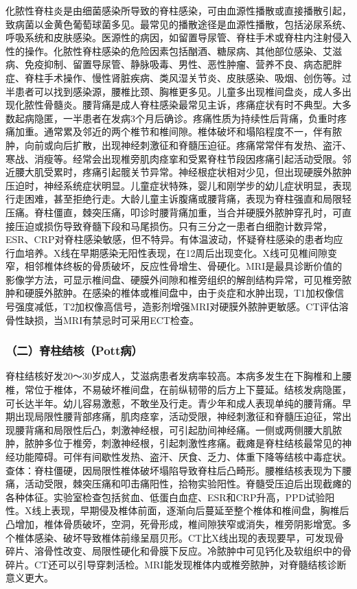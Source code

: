 化脓性脊柱炎是由细菌感染所导致的脊柱感染，可由血源性播散或直接播散引起，致病菌以金黄色葡萄球菌多见。最常见的播散途径是血源性播散，包括泌尿系统、呼吸系统和皮肤感染。医源性的病因，如留置导尿管、脊柱手术或脊柱内注射侵入性的操作。化脓性脊柱感染的危险因素包括酗酒、糖尿病、其他部位感染、艾滋病、免疫抑制、留置导尿管、静脉吸毒、男性、恶性肿瘤、营养不良、病态肥胖症、脊柱手术操作、慢性肾脏疾病、类风湿关节炎、皮肤感染、吸烟、创伤等。过半患者可以找到感染源，腰椎比颈、胸椎更多见。儿童多出现椎间盘炎，成人多出现化脓性骨髓炎。腰背痛是成人脊柱感染最常见主诉，疼痛症状有时不典型。大多数起病隐匿，一半患者在发病3个月后确诊。疼痛性质为持续性后背痛，负重时疼痛加重。通常累及邻近的两个椎节和椎间隙。椎体破坏和塌陷程度不一，伴有脓肿，向前或向后扩散，出现神经刺激征和脊髓压迫征。疼痛常常伴有发热、盗汗、寒战、消瘦等。经常会出现椎旁肌肉痉挛和受累脊柱节段因疼痛引起活动受限。邻近腰大肌受累时，疼痛引起髋关节异常。神经根症状相对少见，但出现硬膜外脓肿压迫时，神经系统症状明显。儿童症状特殊，婴儿和刚学步的幼儿症状明显，表现行走困难，甚至拒绝行走。大龄儿童主诉腹痛或腰背痛，表现为脊柱强直和局限轻压痛。脊柱僵直，棘突压痛，叩诊时腰背痛加重，当合并硬膜外脓肿穿孔时，可直接压迫或损伤导致脊髓下段和马尾损伤。只有三分之一患者白细胞计数异常，ESR、CRP对脊柱感染敏感，但不特异。有体温波动，怀疑脊柱感染的患者均应行血培养。X线在早期感染无阳性表现，在12周后出现变化。X线可见椎间隙变窄，相邻椎体终板的骨质破坏，反应性骨增生、骨硬化。MRI是最具诊断价值的影像学方法，可显示椎间盘、硬膜外间隙和椎旁组织的解剖结构异常，可见椎旁脓肿和硬膜外脓肿。在感染的椎体或椎间盘中，由于炎症和水肿出现，T1加权像信号强度减低，T2加权像高信号，造影剂增强MRI对硬膜外脓肿更敏感。CT评估溶骨性缺损，当MRI有禁忌时可采用ECT检查。

\subsubsection{（二）脊柱结核（Pott病）}

脊柱结核好发20～30岁成人，艾滋病患者发病率较高。本病多发生在下胸椎和上腰椎，常位于椎体，不易破坏椎间盘，在前纵韧带的后方上下蔓延。结核发病隐匿，可长达半年。幼儿容易激惹，不敢坐及行走。青少年和成人表现单纯的腰背痛。早期出现局限性腰背部疼痛，肌肉痉挛，活动受限，神经刺激征和脊髓压迫征，常出现腰背痛和局限性后凸，刺激神经根，可引起肋间神经痛。一侧或两侧腰大肌脓肿，脓肿多位于椎旁，刺激神经根，引起刺激性疼痛。截瘫是脊柱结核最常见的神经功能障碍。可伴有间歇性发热、盗汗、厌食、乏力、体重下降等结核中毒症状。查体：脊柱僵硬，因局限性椎体破坏塌陷导致脊柱后凸畸形。腰椎结核表现为下腰痛，活动受限，棘突压痛和叩击痛阳性，拾物实验阳性。脊髓受压迫后出现截瘫的各种体征。实验室检查包括贫血、低蛋白血症、ESR和CRP升高，PPD试验阳性。X线上表现，早期侵及椎体前面，逐渐向后蔓延至整个椎体和椎间盘，胸椎后凸增加，椎体骨质破坏，空洞，死骨形成，椎间隙狭窄或消失，椎旁阴影增宽。多个椎体感染、破坏导致椎体前缘呈扇贝形。CT比X线出现的表现要早，可发现骨碎片、溶骨性改变、局限性硬化和骨膜下反应。冷脓肿中可见钙化及软组织中的骨碎片。CT还可以引导穿刺活检。MRI能发现椎体内或椎旁脓肿，对脊髓结核诊断意义更大。

